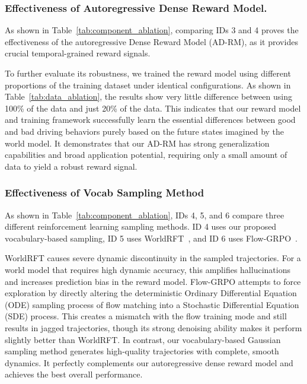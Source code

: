 \documentclass[runningheads]{llncs}
\begin{document}
\subsubsection{Effectiveness of Autoregressive Dense Reward Model.}
As shown in Table~\ref{tab:component_ablation}, comparing IDs 3 and 4 proves the effectiveness of the autoregressive Dense Reward Model (AD-RM), as it provides crucial temporal-grained reward signals.

To further evaluate its robustness, we trained the reward model using different proportions of the training dataset under identical configurations. As shown in Table~\ref{tab:data_ablation}, the results show very little difference between using 100\% of the data and just 20\% of the data. This indicates that our reward model and training framework successfully learn the essential differences between good and bad driving behaviors purely based on the future states imagined by the world model. It demonstrates that our AD-RM has strong generalization capabilities and broad application potential, requiring only a small amount of data to yield a robust reward signal.


\subsubsection{Effectiveness of Vocab Sampling Method}
As shown in Table~\ref{tab:component_ablation}, IDs 4, 5, and 6 compare three different reinforcement learning sampling methods. ID 4 uses our proposed vocabulary-based sampling, ID 5 uses WorldRFT~\cite{yang2025worldrft}, and ID 6 uses Flow-GRPO~\cite{liu2025flow}. 

WorldRFT causes severe dynamic discontinuity in the sampled trajectories. For a world model that requires high dynamic accuracy, this amplifies hallucinations and increases prediction bias in the reward model. Flow-GRPO attempts to force exploration by directly altering the deterministic Ordinary Differential Equation (ODE) sampling process of flow matching into a Stochastic Differential Equation (SDE) process. This creates a mismatch with the flow training mode and still results in jagged trajectories, though its strong denoising ability makes it perform slightly better than WorldRFT. In contrast, our vocabulary-based Gaussian sampling method generates high-quality trajectories with complete, smooth dynamics. It perfectly complements our autoregressive dense reward model and achieves the best overall performance.
\end{document}
